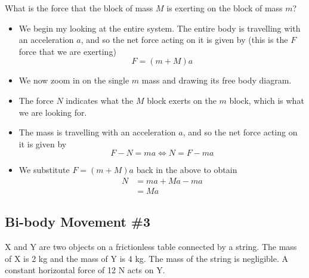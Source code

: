 \documentclass[a4paper,12pt]{article}
\begin{document}
What is the force that the block of mass $M$ is exerting on the block of mass $m$?

\begin{itemize}
  \item We begin my looking at the entire system. The entire body is travelling with an acceleration $a$, and so the net force acting on it is given by (this is the $F$ force that we are exerting)
        $$F = (m + M)a$$
  \item We now zoom in on the single $m$ mass and drawing its free body diagram.
  \item The force $N$ indicates what the $M$ block exerts on the $m$ block, which is what we are looking for.
\end{itemize}

\begin{figure}[H]
  \centering
\end{figure}

\begin{itemize}
  \item The mass is travelling with an acceleration $a$, and so the net force acting on it is given by
        $$F - N = ma \iff N = F - ma$$
  \item We substitute $F = (m+M)a$ back in the above to obtain
        \begin{align*}
          N & = ma + Ma - ma \\
            & = Ma
        \end{align*}
\end{itemize}

\subsection{Bi-body Movement \#3}

X and Y are two objects on a frictionless table connected by a string. The mass of X is 2 kg and the mass of Y is 4 kg. The mass of the string is negligible. A constant horizontal force of 12 N acts on Y.
\end{document}
